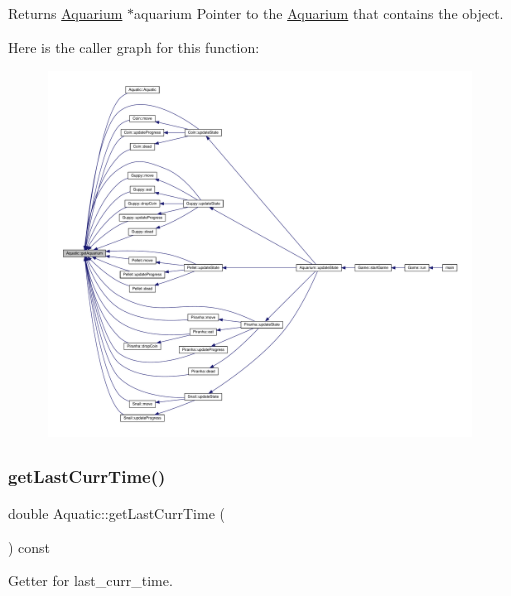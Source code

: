 \begin{DoxyReturn}{Returns}
\mbox{\hyperlink{class_aquarium}{Aquarium}} $\ast$aquarium Pointer to the \mbox{\hyperlink{class_aquarium}{Aquarium}} that contains the object. 
\end{DoxyReturn}
Here is the caller graph for this function\+:\nopagebreak
\begin{figure}[H]
\begin{center}
\leavevmode
\includegraphics[width=350pt]{class_aquatic_aa84812ff8347a11345b9c8231c1375cc_icgraph}
\end{center}
\end{figure}
\mbox{\label{class_aquatic_aba770b1c9ca9481712a6963e7e8e2919}} 
\subsubsection{\texorpdfstring{get\+Last\+Curr\+Time()}{getLastCurrTime()}}
{\footnotesize\ttfamily double Aquatic\+::get\+Last\+Curr\+Time (\begin{DoxyParamCaption}{ }\end{DoxyParamCaption}) const}



Getter for last\+\_\+curr\+\_\+time. 

